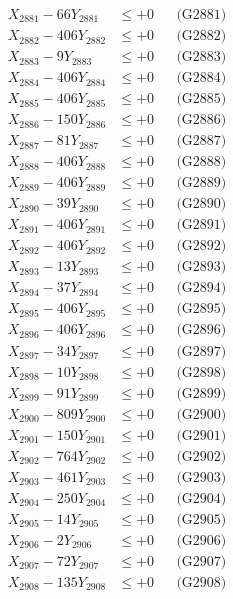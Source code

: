 \documentclass[a4paper,10pt]{article}
\begin{document}
{\begin{align}
\allowbreak
X_{2881} - 66Y_{2881} &\leq +0 && \text{(G2881)} \\
X_{2882} - 406Y_{2882} &\leq +0 && \text{(G2882)} \\
X_{2883} - 9Y_{2883} &\leq +0 && \text{(G2883)} \\
X_{2884} - 406Y_{2884} &\leq +0 && \text{(G2884)} \\
X_{2885} - 406Y_{2885} &\leq +0 && \text{(G2885)} \\
X_{2886} - 150Y_{2886} &\leq +0 && \text{(G2886)} \\
X_{2887} - 81Y_{2887} &\leq +0 && \text{(G2887)} \\
X_{2888} - 406Y_{2888} &\leq +0 && \text{(G2888)} \\
X_{2889} - 406Y_{2889} &\leq +0 && \text{(G2889)} \\
X_{2890} - 39Y_{2890} &\leq +0 && \text{(G2890)} \\
\allowbreak
X_{2891} - 406Y_{2891} &\leq +0 && \text{(G2891)} \\
X_{2892} - 406Y_{2892} &\leq +0 && \text{(G2892)} \\
X_{2893} - 13Y_{2893} &\leq +0 && \text{(G2893)} \\
X_{2894} - 37Y_{2894} &\leq +0 && \text{(G2894)} \\
X_{2895} - 406Y_{2895} &\leq +0 && \text{(G2895)} \\
X_{2896} - 406Y_{2896} &\leq +0 && \text{(G2896)} \\
X_{2897} - 34Y_{2897} &\leq +0 && \text{(G2897)} \\
X_{2898} - 10Y_{2898} &\leq +0 && \text{(G2898)} \\
X_{2899} - 91Y_{2899} &\leq +0 && \text{(G2899)} \\
X_{2900} - 809Y_{2900} &\leq +0 && \text{(G2900)} \\
\allowbreak
X_{2901} - 150Y_{2901} &\leq +0 && \text{(G2901)} \\
X_{2902} - 764Y_{2902} &\leq +0 && \text{(G2902)} \\
X_{2903} - 461Y_{2903} &\leq +0 && \text{(G2903)} \\
X_{2904} - 250Y_{2904} &\leq +0 && \text{(G2904)} \\
X_{2905} - 14Y_{2905} &\leq +0 && \text{(G2905)} \\
X_{2906} - 2Y_{2906} &\leq +0 && \text{(G2906)} \\
X_{2907} - 72Y_{2907} &\leq +0 && \text{(G2907)} \\
X_{2908} - 135Y_{2908} &\leq +0 && \text{(G2908)} \\

\end{align}}
\end{document}
